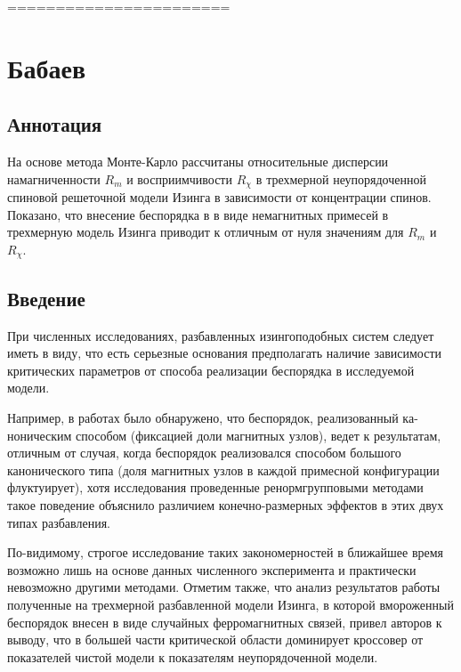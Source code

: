 

=======================




\section{Бабаев}






\subsection{Аннотация}


На основе метода Монте-Карло рассчитаны относительные дисперсии намагниченности  $R_m$ и восприимчивости $R_\chi$  в трехмерной неупорядоченной спиновой решеточной модели Изинга в зависимости от концентрации спинов. Показано, что внесение беспорядка в в виде немагнитных примесей в трехмерную модель Изинга приводит к отличным от нуля значениям для $R_m$ и $R_\chi$.




\subsection{Введение}

При численных исследованиях, разбавленных изингоподобных систем следует иметь в виду, что есть серьезные основания предполагать наличие зависимости критических параметров от способа реализации беспорядка в исследуемой модели.

Например, в работах \cite{ph2_1,ph2_2} было обнаружено, что беспорядок, реализованный ка-ноническим способом (фиксацией доли магнитных узлов), ведет к результатам, отличным от случая, когда беспорядок реализовался способом большого канонического типа (доля магнитных узлов в каждой примесной конфигурации флуктуирует), хотя исследования \cite{ph2_3} проведенные ренормгрупповыми методами такое поведение объяснило различием конечно-размерных эффектов в этих двух типах разбавления.

По-видимому, строгое исследование таких закономерностей в ближайшее время возможно лишь на основе данных численного эксперимента и практически невозможно другими методами. Отметим также, что анализ результатов работы \cite{ph2_4} полученные на трехмерной разбавленной модели Изинга, в которой вмороженный беспорядок внесен в виде случайных ферромагнитных связей, привел авторов к выводу, что в большей части критической области доминирует кроссовер от показателей чистой модели к показателям неупорядоченной модели.

